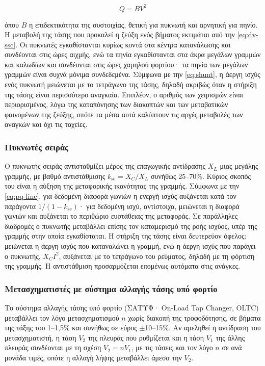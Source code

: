 \begin{equation}
Q = B V^2
\label{eq:shunt}
\end{equation}

όπου $B$ η επιδεκτικότητα της συστοιχίας, θετική για πυκνωτή και αρνητική για πηνίο. Η
μεταβολή της τάσης που προκαλεί η ζεύξη ενός βήματος εκτιμάται από την \eqref{eq:dv-ssc}. Οι
πυκνωτές εγκαθίστανται κυρίως κοντά στα κέντρα κατανάλωσης και συνδέονται στις ώρες αιχμής,
ενώ τα πηνία εγκαθίστανται στα άκρα μεγάλων γραμμών και καλωδίων και συνδέονται στις ώρες
χαμηλού φορτίου· τα πηνία των μεγάλων γραμμών είναι συχνά μόνιμα συνδεδεμένα. Σύμφωνα με την
\eqref{eq:shunt}, η άεργη ισχύς ενός πυκνωτή μειώνεται με το τετράγωνο της τάσης, δηλαδή
ακριβώς όταν η στήριξη της τάσης είναι περισσότερο αναγκαία. Επιπλέον, ο αριθμός των χειρισμών
είναι περιορισμένος, λόγω της καταπόνησης των διακοπτών και των μεταβατικών φαινομένων της
ζεύξης, οπότε τα μέσα αυτά καλύπτουν τις αργές μεταβολές των αναγκών και όχι τις ταχείες.

\subsubsection{Πυκνωτές σειράς}

Ο πυκνωτής σειράς αντισταθμίζει μέρος της επαγωγικής αντίδρασης $X_L$ μιας μεγάλης γραμμής,
με βαθμό αντιστάθμισης $k_{\mathrm{se}} = X_C / X_L$ συνήθως 25--70\%. Κύριος σκοπός του
είναι η αύξηση της μεταφορικής ικανότητας της γραμμής. Σύμφωνα με
την \eqref{eq:pq-line}, για δεδομένη διαφορά γωνιών η ενεργή ισχύς αυξάνεται κατά τον
παράγοντα $1/(1 - k_{\mathrm{se}})$· για δεδομένη ισχύ, αντίστοιχα, μειώνεται η διαφορά
γωνιών και αυξάνεται το περιθώριο ευστάθειας της μεταφοράς. Σε παράλληλες διαδρομές ο
πυκνωτής μεταβάλλει επίσης τον καταμερισμό της ροής ισχύος, υπέρ της γραμμής στην οποία
εγκαθίσταται. Η στήριξη της τάσης είναι δευτερεύον όφελος: μειώνεται η άεργη ισχύς που
καταναλώνει η γραμμή, ενώ η άεργη ισχύς που παράγει ο πυκνωτής, $X_C I^2$, αυξάνεται με το
τετράγωνο του ρεύματος, δηλαδή με τη φόρτιση της γραμμής. Η αντιστάθμιση προσαρμόζεται
επομένως αυτόματα στις ανάγκες.

\subsubsection{Μετασχηματιστές με σύστημα αλλαγής τάσης υπό φορτίο}
\label{sec:oltc}

Το σύστημα αλλαγής τάσης υπό φορτίο (ΣΑΤΥΦ· On-Load Tap Changer, OLTC) μεταβάλλει τον λόγο
μετασχηματισμού $n$ χωρίς διακοπή της τροφοδότησης, σε βήματα της τάξης του 1--1,5\% και
συνήθως σε εύρος $\pm$10--15\%. Αν αμεληθεί η αντίδραση του μετασχηματιστή, η τάση $V_2$ της
πλευράς που ρυθμίζεται και η τάση $V_1$ της άλλης πλευράς συνδέονται με τη σχέση $V_2 = n V_1$,
με τις τάσεις και τον λόγο $n$ σε ανά μονάδα τιμές, οπότε η αλλαγή λήψης μεταβάλλει άμεσα την
$V_2$.

